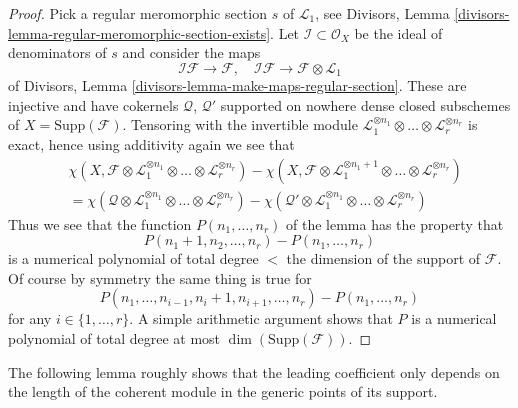 \begin{proof}
\medskip\noindent
Pick a regular meromorphic section $s$ of $\mathcal{L}_1$, see
Divisors, Lemma \ref{divisors-lemma-regular-meromorphic-section-exists}.
Let $\mathcal{I} \subset \mathcal{O}_X$ be the ideal of
denominators of $s$ and consider the maps
$$
\mathcal{I}\mathcal{F} \to \mathcal{F},\quad
\mathcal{I}\mathcal{F} \to \mathcal{F} \otimes \mathcal{L}_1
$$
of Divisors, Lemma \ref{divisors-lemma-make-maps-regular-section}.
These are injective and have cokernels $\mathcal{Q}$, $\mathcal{Q}'$
supported on nowhere dense closed subschemes of $X = \text{Supp}(\mathcal{F})$.
Tensoring with the invertible module
$\mathcal{L}_1^{\otimes n_1} \otimes \ldots \otimes \mathcal{L}_r^{\otimes n_r}$
is exact, hence using additivity again
we see that
\begin{align*}
&\chi(X, \mathcal{F} \otimes \mathcal{L}_1^{\otimes n_1} \otimes \ldots \otimes
\mathcal{L}_r^{\otimes n_r}) -
\chi(X, \mathcal{F} \otimes \mathcal{L}_1^{\otimes n_1 + 1}
\otimes \ldots \otimes \mathcal{L}_r^{\otimes n_r}) \\
& =
\chi(\mathcal{Q} \otimes \mathcal{L}_1^{\otimes n_1} \otimes \ldots \otimes
\mathcal{L}_r^{\otimes n_r}) -
\chi(\mathcal{Q}' \otimes \mathcal{L}_1^{\otimes n_1} \otimes \ldots \otimes
\mathcal{L}_r^{\otimes n_r})
\end{align*}
Thus we see that the function $P(n_1, \ldots, n_r)$ of the lemma has
the property that
$$
P(n_1 + 1, n_2, \ldots, n_r) - P(n_1, \ldots, n_r)
$$
is a numerical polynomial of total degree $<$ the dimension
of the support of $\mathcal{F}$. Of course by symmetry the same
thing is true for
$$
P(n_1, \ldots, n_{i - 1}, n_i + 1, n_{i + 1}, \ldots, n_r)
- P(n_1, \ldots, n_r)
$$
for any $i \in \{1, \ldots, r\}$. A simple arithmetic argument shows
that $P$ is a numerical polynomial of total degree at most
$\dim(\text{Supp}(\mathcal{F}))$.
\end{proof}

\noindent
The following lemma roughly shows that the leading coefficient only depends
on the length of the coherent module in the generic points of its
support.

